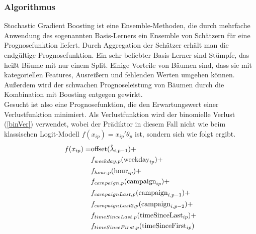 \subsubsection*{Algorithmus}

Stochastic Gradient Boosting ist eine Ensemble-Methoden, die durch mehrfache Anwendung des sogenannten Basis-Lerners ein Ensemble von Schätzern für eine Prognosefunktion liefert. Durch Aggregation der Schätzer erhält man die endgültige Prognosefunktion. Ein sehr beliebter Basis-Lerner sind Stümpfe, das heißt Bäume mit nur einem Split. Einige Vorteile von Bäumen sind, dass sie mit kategoriellen Features, Ausreißern und fehlenden Werten umgehen können. Außerdem wird der schwachen Prognoseleistung von Bäumen durch die Kombination mit Boosting entgegen gewirkt.\\
Gesucht ist also eine Prognosefunktion, die den Erwartungswert einer Verlustfunktion minimiert. Als Verlustfunktion wird der binomielle Verlust (\ref{binVer}) verwendet, wobei der Prädiktor in diesem Fall nicht wie beim klassischen Logit-Modell $f(x_{ip})=x_{ip}'\theta_p$ ist, sondern sich wie folgt ergibt.
\begin{align}
	f(x_{ip}) =& \text{offset}(\hat{\lambda}_{i,p-1}) + \notag \\
						 &f_{weekday,p}(\text{weekday}_{ip}) + \notag \\
						 &f_{hour,p}(\text{hour}_{ip}) + \notag \\
						 &f_{campaign,p}(\text{campaign}_{ip}) + \notag \\
						 &f_{campaignLast,p}(\text{campaign}_{i,p-1}) + \notag \\
						 &f_{campaignLast2,p}(\text{campaign}_{i,p-2}) + \notag \\
						 &f_{timeSinceLast,p}(\text{timeSinceLast}_{ip}) + \notag \\
						 &f_{timeSinceFirst,p}(\text{timeSinceFirst}_{ip}) \label{praediktor}
\end{align}
